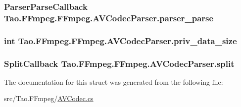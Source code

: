 \label{struct_tao_1_1_f_fmpeg_1_1_f_fmpeg_1_1_a_v_codec_parser_a2c31d25feb0402bfd0a0dd3a66b190ab}
\hypertarget{struct_tao_1_1_f_fmpeg_1_1_f_fmpeg_1_1_a_v_codec_parser_a135cf4d2ed1301ee820f43201dc1b3d9}{
\subsubsection[{parser\_\-parse}]{\setlength{\rightskip}{0pt plus 5cm}ParserParseCallback {\bf Tao.FFmpeg.FFmpeg.AVCodecParser.parser\_\-parse}}}
\label{struct_tao_1_1_f_fmpeg_1_1_f_fmpeg_1_1_a_v_codec_parser_a135cf4d2ed1301ee820f43201dc1b3d9}
\hypertarget{struct_tao_1_1_f_fmpeg_1_1_f_fmpeg_1_1_a_v_codec_parser_afdadc131385833ec7c18f9590354f7a1}{
\subsubsection[{priv\_\-data\_\-size}]{\setlength{\rightskip}{0pt plus 5cm}int {\bf Tao.FFmpeg.FFmpeg.AVCodecParser.priv\_\-data\_\-size}}}
\label{struct_tao_1_1_f_fmpeg_1_1_f_fmpeg_1_1_a_v_codec_parser_afdadc131385833ec7c18f9590354f7a1}
\hypertarget{struct_tao_1_1_f_fmpeg_1_1_f_fmpeg_1_1_a_v_codec_parser_a531aad23139c0236b67ae76e7399da93}{
\subsubsection[{split}]{\setlength{\rightskip}{0pt plus 5cm}SplitCallback {\bf Tao.FFmpeg.FFmpeg.AVCodecParser.split}}}
\label{struct_tao_1_1_f_fmpeg_1_1_f_fmpeg_1_1_a_v_codec_parser_a531aad23139c0236b67ae76e7399da93}


The documentation for this struct was generated from the following file:\begin{DoxyCompactItemize}
\item 
src/Tao.FFmpeg/\hyperlink{_a_v_codec_8cs}{AVCodec.cs}\end{DoxyCompactItemize}
